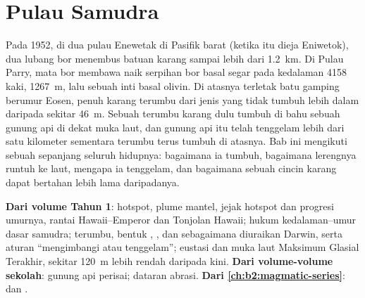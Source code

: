 \chapter{Pulau Samudra}\label{ch:b2:oceanic-islands}

Pada 1952, di dua pulau  Enewetak di Pasifik barat (ketika itu dieja Eniwetok), dua
lubang bor menembus batuan karang sampai lebih dari \qty{1.2}{km}. Di Pulau Parry, mata bor
membawa naik serpihan bor basal segar pada kedalaman 4158 kaki, \qty{1267}{m}, lalu sebuah inti
basal olivin. Di atasnya terletak batu gamping berumur Eosen, penuh karang terumbu dari jenis yang tidak
tumbuh lebih dalam daripada sekitar \qty{46}{m}. Sebuah terumbu karang dulu tumbuh di bahu sebuah gunung api di dekat
muka laut, dan gunung api itu telah tenggelam lebih dari satu kilometer sementara terumbu terus tumbuh di atasnya.
Bab ini mengikuti sebuah  sepanjang seluruh hidupnya: bagaimana ia tumbuh, bagaimana lerengnya
runtuh ke laut, mengapa ia tenggelam, dan bagaimana sebuah cincin karang dapat bertahan lebih lama daripadanya.

\begin{recall}
\textbf{Dari volume Tahun 1}: hotspot, plume mantel, jejak hotspot dan progresi umurnya,
rantai Hawaii--Emperor dan Tonjolan Hawaii; hukum kedalaman--umur dasar samudra; terumbu,
bentuk , , dan  sebagaimana diuraikan Darwin, serta aturan ``mengimbangi atau
tenggelam''; eustasi dan muka laut Maksimum Glasial Terakhir, sekitar \qty{120}{m} lebih rendah daripada
kini. \textbf{Dari volume-volume sekolah}: gunung api perisai; dataran abrasi.
\textbf{Dari \cref{ch:b2:magmatic-series}}:  dan .
\end{recall}

